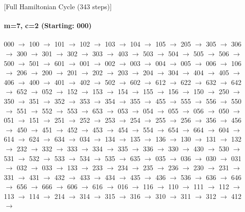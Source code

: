 [Full Hamiltonian Cycle (343 steps)]


\paragraph{ m=7, c=2 (Starting: 000)}



000 $\rightarrow$ 100 $\rightarrow$ 101 $\rightarrow$ 102 $\rightarrow$ 103 $\rightarrow$ 104 $\rightarrow$ 105 $\rightarrow$ 205 $\rightarrow$ 305 $\rightarrow$ 306 $\rightarrow$ 300 $\rightarrow$ 301 $\rightarrow$ 302 $\rightarrow$ 303 $\rightarrow$ 403 $\rightarrow$ 503 $\rightarrow$ 504 $\rightarrow$ 505 $\rightarrow$ 506 $\rightarrow$ 500 $\rightarrow$ 501 $\rightarrow$ 601 $\rightarrow$ 001 $\rightarrow$ 002 $\rightarrow$ 003 $\rightarrow$ 004 $\rightarrow$ 005 $\rightarrow$ 006 $\rightarrow$ 106 $\rightarrow$ 206 $\rightarrow$ 200 $\rightarrow$ 201 $\rightarrow$ 202 $\rightarrow$ 203 $\rightarrow$ 204 $\rightarrow$ 304 $\rightarrow$ 404 $\rightarrow$ 405 $\rightarrow$ 406 $\rightarrow$ 400 $\rightarrow$ 401 $\rightarrow$ 402 $\rightarrow$ 502 $\rightarrow$ 602 $\rightarrow$ 612 $\rightarrow$ 622 $\rightarrow$ 632 $\rightarrow$ 642 $\rightarrow$ 652 $\rightarrow$ 052 $\rightarrow$ 152 $\rightarrow$ 153 $\rightarrow$ 154 $\rightarrow$ 155 $\rightarrow$ 156 $\rightarrow$ 150 $\rightarrow$ 250 $\rightarrow$ 350 $\rightarrow$ 351 $\rightarrow$ 352 $\rightarrow$ 353 $\rightarrow$ 354 $\rightarrow$ 355 $\rightarrow$ 455 $\rightarrow$ 555 $\rightarrow$ 556 $\rightarrow$ 550 $\rightarrow$ 551 $\rightarrow$ 552 $\rightarrow$ 553 $\rightarrow$ 653 $\rightarrow$ 053 $\rightarrow$ 054 $\rightarrow$ 055 $\rightarrow$ 056 $\rightarrow$ 050 $\rightarrow$ 051 $\rightarrow$ 151 $\rightarrow$ 251 $\rightarrow$ 252 $\rightarrow$ 253 $\rightarrow$ 254 $\rightarrow$ 255 $\rightarrow$ 256 $\rightarrow$ 356 $\rightarrow$ 456 $\rightarrow$ 450 $\rightarrow$ 451 $\rightarrow$ 452 $\rightarrow$ 453 $\rightarrow$ 454 $\rightarrow$ 554 $\rightarrow$ 654 $\rightarrow$ 664 $\rightarrow$ 604 $\rightarrow$ 614 $\rightarrow$ 624 $\rightarrow$ 634 $\rightarrow$ 034 $\rightarrow$ 134 $\rightarrow$ 135 $\rightarrow$ 136 $\rightarrow$ 130 $\rightarrow$ 131 $\rightarrow$ 132 $\rightarrow$ 232 $\rightarrow$ 332 $\rightarrow$ 333 $\rightarrow$ 334 $\rightarrow$ 335 $\rightarrow$ 336 $\rightarrow$ 330 $\rightarrow$ 430 $\rightarrow$ 530 $\rightarrow$ 531 $\rightarrow$ 532 $\rightarrow$ 533 $\rightarrow$ 534 $\rightarrow$ 535 $\rightarrow$ 635 $\rightarrow$ 035 $\rightarrow$ 036 $\rightarrow$ 030 $\rightarrow$ 031 $\rightarrow$ 032 $\rightarrow$ 033 $\rightarrow$ 133 $\rightarrow$ 233 $\rightarrow$ 234 $\rightarrow$ 235 $\rightarrow$ 236 $\rightarrow$ 230 $\rightarrow$ 231 $\rightarrow$ 331 $\rightarrow$ 431 $\rightarrow$ 432 $\rightarrow$ 433 $\rightarrow$ 434 $\rightarrow$ 435 $\rightarrow$ 436 $\rightarrow$ 536 $\rightarrow$ 636 $\rightarrow$ 646 $\rightarrow$ 656 $\rightarrow$ 666 $\rightarrow$ 606 $\rightarrow$ 616 $\rightarrow$ 016 $\rightarrow$ 116 $\rightarrow$ 110 $\rightarrow$ 111 $\rightarrow$ 112 $\rightarrow$ 113 $\rightarrow$ 114 $\rightarrow$ 214 $\rightarrow$ 314 $\rightarrow$ 315 $\rightarrow$ 316 $\rightarrow$ 310 $\rightarrow$ 311 $\rightarrow$ 312 $\rightarrow$ 412 $\rightarrow$ 